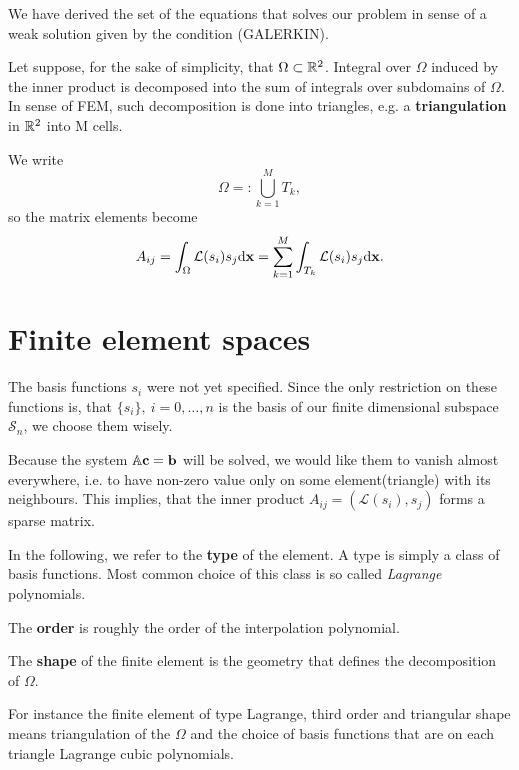 \par We have derived the set of the equations that solves our problem in sense of a weak solution given by the condition (GALERKIN). 

\par Let suppose, for the sake of simplicity, that $\Omega \subset \mathbb{R}^2$. 
Integral over $\Omega$ induced by the inner product is decomposed into the sum of integrals over subdomains of $\Omega$. 
In sense of FEM, such decomposition is done into triangles, e.g. a \textbf{triangulation} in $\mathbb{R}^2$ into M cells.

We write
$$ \Omega =: \bigcup^M_{k=1} T_k, $$
so the matrix elements become
$$ A_{ij} = \int_\Omega \mathcal L(s_i)s_j \mathrm d \mathbf{x} = \sum_{k=1}^M \int_{T_k} \mathcal L(s_i)s_j \mathrm d \mathbf{x}.$$

\section{Finite element spaces}

\par The basis functions $s_i$ were not yet specified. Since the only restriction on these functions is, 
that $\{s_i\},~i=0,\ldots,n$ is the basis of our finite dimensional subspace $\mathcal S_n$, we choose them wisely. 

\par Because the system $\mathbb{A} \mathbf{c} = \mathbf{b}$ will be solved, we would like them to vanish almost everywhere, i.e. to have non-zero value 
only on some element(triangle) with its neighbours. This implies, that the inner product $A_{ij} = (\mathcal L(s_i), s_j)$ forms a sparse matrix.

\par In the following, we refer to the \textbf{type} of the element. A type is simply a class of basis functions.
Most common choice of this class is so called \textit{Lagrange} polynomials.
\par The \textbf{order} is roughly the order of the interpolation polynomial.
\par The \textbf{shape} of the finite element is the geometry that defines the decomposition of $\Omega$.

\par For instance the finite element of type Lagrange, third order and triangular shape means triangulation of the $\Omega$ and  the choice of basis functions 
that are on each triangle Lagrange cubic polynomials.
 
